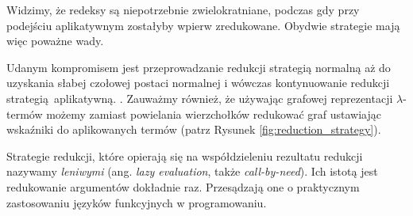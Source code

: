 Widzimy, że redeksy są niepotrzebnie zwielokratniane, podczas gdy przy podejściu aplikatywnym zostałyby wpierw zredukowane. Obydwie strategie mają więc poważne wady.

Udanym kompromisem jest przeprowadzanie redukcji strategią normalną aż do uzyskania słabej czołowej postaci normalnej i wówczas kontynuowanie redukcji strategią aplikatywną. \cite[Rozdział 11.3]{PeytonJones:1987:IFP:1096899}. Zauważmy również, że używając grafowej reprezentacji \(\lambda\)-termów możemy zamiast powielania wierzchołków redukować graf ustawiając wskaźniki do aplikowanych termów (patrz Rysunek \ref{fig:reduction_strategy}). 

Strategie redukcji, które opierają się na współdzieleniu rezultatu redukcji nazywamy \emph{leniwymi} (ang. \emph{lazy evaluation}, także \emph{call-by-need}). Ich istotą jest redukowanie argumentów dokładnie raz. Przesądzają one o praktycznym zastosowaniu języków funkcyjnych w programowaniu.
